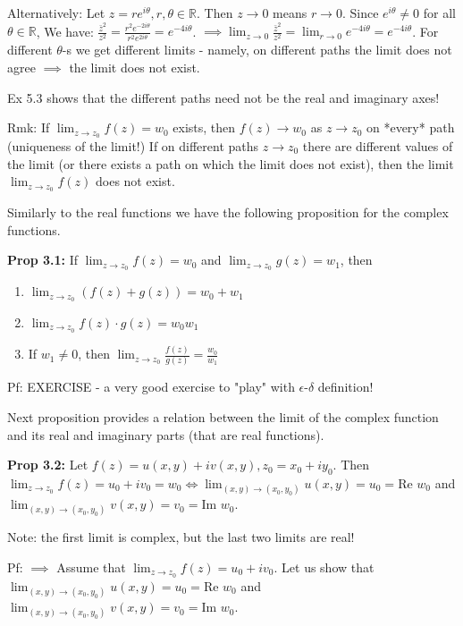 \documentclass{article}
\begin{document}
Alternatively: Let $z = re^{i\theta}, r, \theta \in \mathbb{R}$. Then $z \to 0$ means $r \to 0$. Since $e^{i\theta} \neq 0$ for all $\theta \in \mathbb{R}$, We have: $\frac{\bar{z}^2}{z^2} = \frac{r^2 e^{-2i\theta}}{r^2 e^{2i\theta}} = e^{-4i\theta}$.
$\implies \lim_{z \to 0} \frac{\bar{z}^2}{z^2} = \lim_{r \to 0} e^{-4i\theta} = e^{-4i\theta}$. For different $\theta$-s we get different limits - namely, on different paths the limit does not agree $\implies$ the limit does not exist.

Ex 5.3 shows that the different paths need not be the real and imaginary axes!

Rmk: If $\lim_{z \to z_0} f(z) = w_0$ exists, then $f(z) \to w_0$ as $z \to z_0$ on *every* path (uniqueness of the limit!) If on different paths $z \to z_0$ there are different values of the limit (or there exists a path on which the limit does not exist), then the limit $\lim_{z \to z_0} f(z)$ does not exist.

Similarly to the real functions we have the following proposition for the complex functions.

\textbf{Prop 3.1:} If $\lim_{z \to z_0} f(z) = w_0$ and $\lim_{z \to z_0} g(z) = w_1$, then
\begin{enumerate}
    \item $\lim_{z \to z_0} (f(z) + g(z)) = w_0 + w_1$
    \item $\lim_{z \to z_0} f(z) \cdot g(z) = w_0 w_1$
    \item If $w_1 \neq 0$, then $\lim_{z \to z_0} \frac{f(z)}{g(z)} = \frac{w_0}{w_1}$
\end{enumerate}

Pf: EXERCISE - a very good exercise to "play" with $\epsilon$-$\delta$ definition!

Next proposition provides a relation between the limit of the complex function and its real and imaginary parts (that are real functions).

\textbf{Prop 3.2:} Let $f(z) = u(x, y) + iv(x, y), z_0 = x_0 + iy_0$. Then $\lim_{z \to z_0} f(z) = u_0 + iv_0 = w_0 \iff \lim_{(x, y) \to (x_0, y_0)} u(x, y) = u_0 = \text{Re } w_0$ and $\lim_{(x, y) \to (x_0, y_0)} v(x, y) = v_0 = \text{Im } w_0$.

Note: the first limit is complex, but the last two limits are real!

Pf: $\implies$ Assume that $\lim_{z \to z_0} f(z) = u_0 + iv_0$. Let us show that $\lim_{(x, y) \to (x_0, y_0)} u(x, y) = u_0 = \text{Re } w_0$ and $\lim_{(x, y) \to (x_0, y_0)} v(x, y) = v_0 = \text{Im } w_0$.
\end{document}
